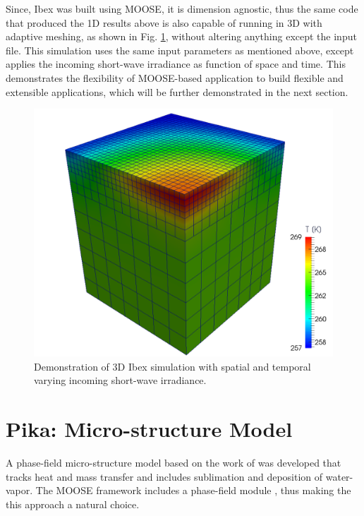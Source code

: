 Since, Ibex was built using MOOSE, it is dimension agnostic, thus the same code that produced the 1D results above is also capable of running in 3D with adaptive meshing, as shown in Fig. \ref{fig:ibex_3d}, without altering anything except the input file. This simulation uses the same input parameters as mentioned above, except applies the incoming short-wave irradiance as function of space and time. This demonstrates the flexibility of MOOSE-based application to build flexible and extensible applications, which will be further demonstrated in the next section.

\begin{figure}[b]
  \includegraphics[width=\linewidth]{figures/ibex3d.pdf}
  \caption{Demonstration of 3D Ibex simulation with spatial and temporal varying incoming short-wave irradiance.}
  \label{fig:ibex_3d}
\end{figure}


\section{Pika: Micro-structure Model}\label{sec:pika}
A phase-field micro-structure model based on the work of \citet{kaempfer2009phase} was developed that tracks heat and mass transfer and includes sublimation and deposition of water-vapor. The MOOSE framework includes a phase-field module \citep{tonks2012object}, thus making the this approach a natural choice.

